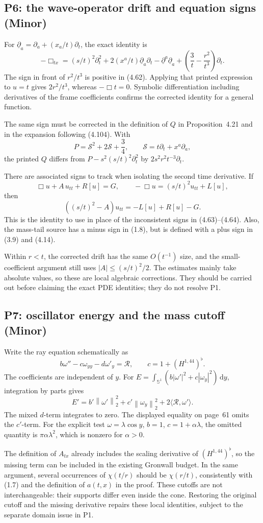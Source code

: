 \documentclass[10pt]{article}
\begin{document}
\subsection*{P6: the wave-operator drift and equation signs (Minor)}
For \(\underline\partial_a=\partial_a+(x_a/t)\partial_t\), the exact identity is \[-\Box_{tx}
 =(s/t)^2\partial_t^2
 +2(x^a/t)\underline\partial_a\partial_t-\underline\partial^a\underline\partial_a
 +\left(\frac3t-\frac{r^2}{t^3}\right)\partial_t.\] The sign in front of \(r^2/t^3\) is positive in (4.62). Applying that printed expression to \(u=t\) gives \(2r^2/t^3\), whereas \(-\Box t=0\). Symbolic differentiation including derivatives of the frame coefficients confirms the corrected identity for a general function.\par
The same sign must be corrected in the definition of \(Q\) in Proposition 4.21 and in the expansion following (4.104). With \[P=\mathcal S^2+2\mathcal S+\frac34,\qquad \mathcal S=t\partial_t+x^a\partial_a,\] the printed \(Q\) differs from \(P-s^2(s/t)^2\partial_t^2\) by \(2s^2r^2t^{-3}\partial_t\).\par
There are associated signs to track when isolating the second time derivative. If \[\Box u+A\,u_{tt}+R[u]=G,\qquad -\Box u=(s/t)^2u_{tt}+L[u],\] then \[((s/t)^2-A)u_{tt}=-L[u]+R[u]-G.\] This is the identity to use in place of the inconsistent signs in (4.63)–(4.64). Also, the mass-tail source has a minus sign in (1.8), but is defined with a plus sign in (3.9) and (4.14).\par
Within \(r<t\), the corrected drift has the same \(O(t^{-1})\) size, and the small-coefficient argument still uses \(|A|\leq(s/t)^2/2\). The estimates mainly take absolute values, so these are local algebraic corrections. They should be carried out before claiming the exact PDE identities; they do not resolve P1.\par
\subsection*{P7: oscillator energy and the mass cutoff (Minor)}
Write the ray equation schematically as \[b\omega''-c\omega_{yy}-d\omega'_y=\mathcal R,
 \qquad c=1+(H^{1,44})^\flat.\] The coefficients are independent of \(y\). For \(E=\int_{\mathbb S^1}(b|\omega'|^2+c|\omega_y|^2)\,\mathrm dy\), integration by parts gives \[E'=b'\left\|\omega'\right\|_2^2+c'\left\|\omega_y\right\|_2^2
       +2\langle\mathcal R,\omega'\rangle.\] The mixed \(d\)-term integrates to zero. The displayed equality on page 61 omits the \(c'\)-term. For the explicit test \(\omega=\lambda\cos y\), \(b=1\), \(c=1+\alpha\lambda\), the omitted quantity is \(\pi\alpha\lambda^2\), which is nonzero for \(\alpha>0\).\par
The definition of \(A_{tx}\) already includes the scaling derivative of \((H^{1,44})^\flat\), so the missing term can be included in the existing Gronwall budget. In the same argument, several occurrences of \(\chi(t/r)\) should be \(\chi(r/t)\), consistently with (1.7) and the definition of \(a(t,x)\) in the proof. These cutoffs are not interchangeable: their supports differ even inside the cone. Restoring the original cutoff and the missing derivative repairs these local identities, subject to the separate domain issue in P1.\par
\end{document}
